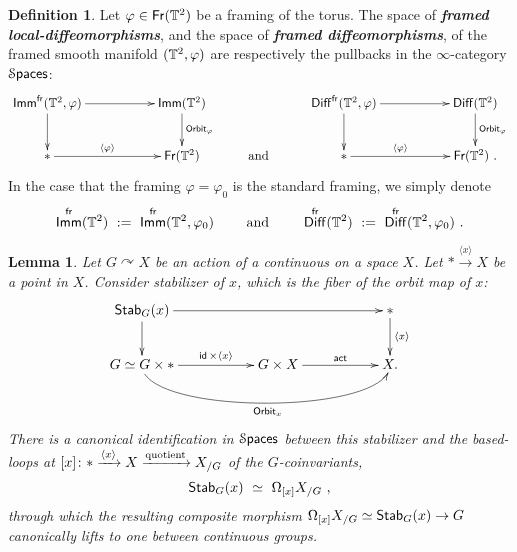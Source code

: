 \documentclass{amsart}
\newtheorem{lemma}[theorem]{Lemma}
\theoremstyle{definition}
\newtheorem{definition}[theorem]{Definition}
\theoremstyle{remark}
\newcommand{\bit}[1]{\textbf{\textit{#1}}}
\newcommand{\lacts}{\curvearrowright}
\DeclareMathOperator{\Diff}{{\sf Diff}}
\DeclareMathOperator{\Spaces}{\cS\mathsf{paces}}
\newcommand{\lag}{\langle}
\newcommand{\rag}{\rangle}
\newcommand{\xra}{\xrightarrow}
\DeclareMathOperator{\Fr}{\sf Fr}
\DeclareMathOperator{\id}{\sf id}
\DeclareMathOperator{\Imm}{\sf Imm}
\begin{document}
\begin{definition}\label{d1}
Let $\varphi\in \Fr(\TT^2)$ be a framing of the torus.  
The space of \bit{framed local-diffeomorphisms}, and the space of \bit{framed diffeomorphisms}, of the framed smooth manifold $(\mathbb T^2,\varphi)$ are respectively the pullbacks in the $\infty$-category $\Spaces$:
\begin{equation*}%
\xymatrix{
\Imm^{\sf fr}(\TT^2,\varphi)
\ar[rr]
\ar[d]
&&
\Imm(\TT^2)
\ar[d]^-{{\sf Orbit}_\varphi}
&&
\Diff^{\sf fr}(\TT^2,\varphi)
\ar[rr]
\ar[d]
&&
\Diff(\TT^2)
\ar[d]^-{{\sf Orbit}_\varphi}
\\
\ast
\ar[rr]^-{\lag \varphi \rag}
&&
\Fr(\TT^2)
&
\text{ and }
&
\ast
\ar[rr]^-{\lag \varphi \rag}
&&
\Fr(\TT^2)
~.
}
\end{equation*}
In the case that the framing $\varphi = \varphi_0$ is the standard framing, we simply denote
\[
\Imm^{\sf fr}(\TT^2)
~:=~
\Imm^{\sf fr}(\TT^2,\varphi_0)
\qquad
\text{ and }
\qquad
\Diff^{\sf fr}(\TT^2)
~:=~
\Diff^{\sf fr}(\TT^2,\varphi_0)
~.
\]
\end{definition}








\begin{lemma}\label{t2}
Let $G \lacts X$ be an action of a continuous on a space $X$.
Let $\ast \xra{\lag x \rag } X$ be a point in $X$.
Consider stabilizer of $x$, which is the fiber of the orbit map of $x$:
\begin{equation}
\label{e52}
\xymatrix{
{\sf Stab}_G(x)
\ar[rrrr]
\ar[d]
&&
&&
\ast
\ar[d]^-{\lag x \rag}
\\
G \simeq G\times \ast 
\ar[rr]^-{ \id \times \lag x \rag} 
\ar@(d,d)[rrrr]_-{{\sf Orbit}_x}
&&
G \times X 
\ar[rr]^-{\sf act} 
&&
X
.
}
\end{equation}
There is a canonical identification in $\Spaces$ between this stabilizer and the based-loops at $[x]\colon \ast \xra{\lag x \rag} X \xra{\rm quotient} X_{/G}$ of the $G$-coinvariants,
\[
{\sf Stab}_G(x)
~\simeq~
\Omega_{[x]} X_{/G}
~,
\]
through which the resulting composite morphism $\Omega_{[x]} X_{/G}
\simeq {\sf Stab}_G(x)
\to 
G
$
canonically lifts to one between continuous groups.

\end{lemma}
\end{document}
